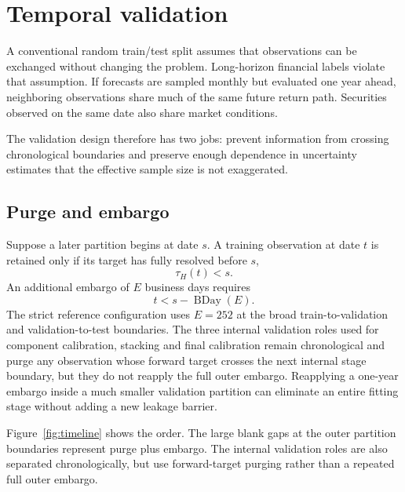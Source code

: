\documentclass[11pt]{article}
\begin{document}
\section{Temporal validation}
\label{sec:temporal}

A conventional random train/test split assumes that observations can be exchanged without changing the problem. Long-horizon financial labels violate that assumption. If forecasts are sampled monthly but evaluated one year ahead, neighboring observations share much of the same future return path. Securities observed on the same date also share market conditions.

The validation design therefore has two jobs: prevent information from crossing chronological boundaries and preserve enough dependence in uncertainty estimates that the effective sample size is not exaggerated.

\subsection{Purge and embargo}

Suppose a later partition begins at date $s$. A training observation at date $t$ is retained only if its target has fully resolved before $s$,
\begin{equation}
\tau_H(t)<s.
\label{eq:purge}
\end{equation}
An additional embargo of $E$ business days requires
\begin{equation}
t<s-\operatorname{BDay}(E).
\label{eq:embargo}
\end{equation}
The strict reference configuration uses $E=252$ at the broad train-to-validation and validation-to-test boundaries. The three internal validation roles used for component calibration, stacking and final calibration remain chronological and purge any observation whose forward target crosses the next internal stage boundary, but they do not reapply the full outer embargo. Reapplying a one-year embargo inside a much smaller validation partition can eliminate an entire fitting stage without adding a new leakage barrier.

Figure~\ref{fig:timeline} shows the order. The large blank gaps at the outer partition boundaries represent purge plus embargo. The internal validation roles are also separated chronologically, but use forward-target purging rather than a repeated full outer embargo.
\end{document}

